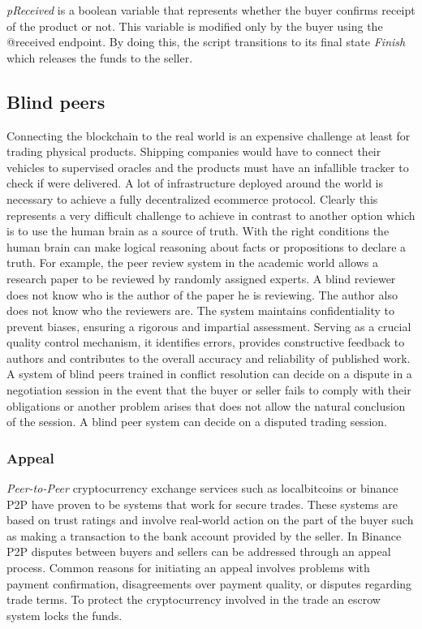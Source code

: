 \documentclass[12pt]{article}
\begin{document}
\emph{pReceived} is a boolean variable that represents whether the buyer confirms receipt of the product or not. This variable is modified only by the buyer using the @received endpoint.
By doing this, the script transitions to its final state \emph{Finish} which releases the funds to the seller.
 
 
\subsection { Blind peers }  

Connecting the blockchain to the real world is an expensive challenge at least for trading physical products.
Shipping companies would have to connect their vehicles to supervised oracles and the products must have an infallible tracker to check if were delivered.
A lot of infrastructure deployed around the world is necessary to achieve a fully decentralized ecommerce protocol.
Clearly this represents a very difficult challenge to achieve in contrast to another option which is to use the human brain as a source of truth.
With the right conditions the human brain can make logical reasoning about facts or propositions to declare a truth.
For example, the peer review system in the academic world allows a research paper to be reviewed by randomly assigned experts.
A blind reviewer does not know who is the author of the paper he is reviewing.
The author also does not know who the reviewers are.
The system maintains confidentiality to prevent biases, ensuring a rigorous and impartial assessment. Serving as a crucial quality control mechanism, it identifies errors, provides constructive feedback to authors and contributes to the overall accuracy and reliability of published work. 
A system of blind peers trained in conflict resolution can decide on a dispute in a negotiation session in the event that the buyer or seller fails to comply with their obligations or another problem arises that does not allow the natural conclusion of the session.
A blind peer system can decide on a disputed trading session.

\subsubsection { Appeal } 

\emph{Peer-to-Peer} cryptocurrency exchange services such as localbitcoins or binance P2P have proven to be systems that work for secure trades. These systems are based on trust ratings and involve real-world action on the part of the buyer such as making a transaction to the bank account provided by the seller. In Binance P2P disputes between buyers and sellers can be addressed through an appeal process. Common reasons for initiating an appeal involves problems with payment confirmation, disagreements over payment quality, or disputes regarding trade terms. To protect the cryptocurrency involved in the trade an escrow system locks the funds.
\end{document}
